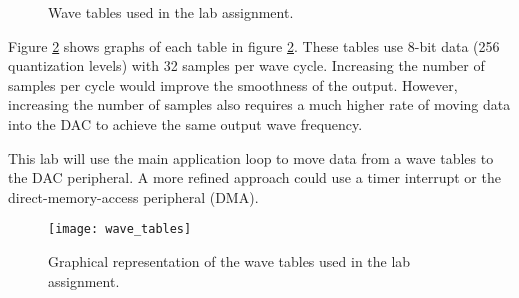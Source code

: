 \documentclass[openany,11pt,fleqn]{book} %
\newcommand{\code}[3]{
    \begin{figure}[]
        \colorbox{gray!20!white}{
            \parbox{\linewidth-2\fboxsep} {
                \centering 
                
            }
        }
        \caption{#2}
        \label{#3}
    \end{figure}
}
\begin{document}
 
%         
% 
 
\code{./Files/wave_tables.c}{Wave tables used in the lab assignment.}{wave_tables}
 
Figure \ref{wave_tables} shows graphs of each table in figure \ref{wave_tables}. These tables use 8-bit data (256 quantization levels) with 32 samples per wave cycle. Increasing the number of samples per cycle would improve the smoothness of the output. However, increasing the number of samples also requires a much higher rate of moving data into the DAC to achieve the same output wave frequency. 

This lab will use the main application loop to move data from a wave tables to the DAC peripheral. A more refined approach could use a timer interrupt or the direct-memory-access peripheral (DMA). 

\begin{figure}[]
    \centering\texttt{[image: wave\_tables]}
    \caption{Graphical representation of the wave tables used in the lab assignment.}
    \label{wave_tables}
\end{figure}
 
\end{document}
